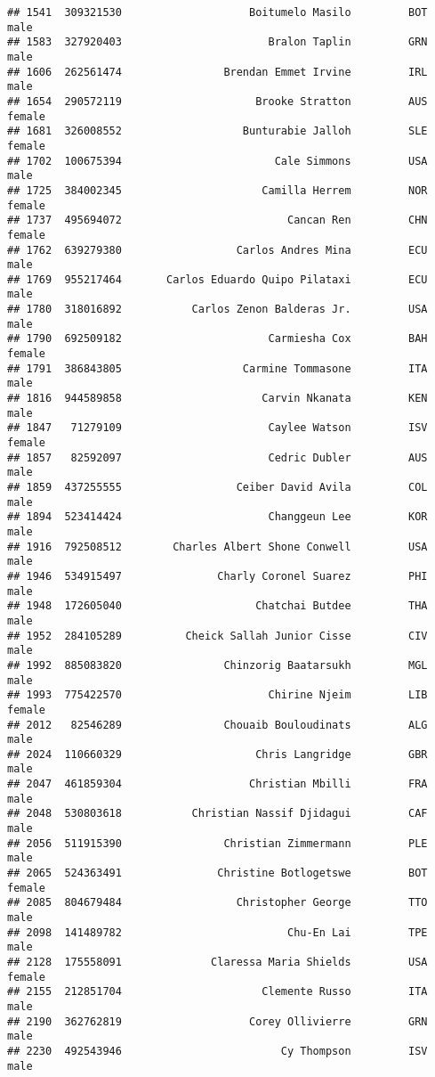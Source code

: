 \documentclass[]{article}
\begin{document}
\begin{verbatim}
## 1541  309321530                    Boitumelo Masilo         BOT   male
## 1583  327920403                       Bralon Taplin         GRN   male
## 1606  262561474                Brendan Emmet Irvine         IRL   male
## 1654  290572119                     Brooke Stratton         AUS female
## 1681  326008552                   Bunturabie Jalloh         SLE female
## 1702  100675394                        Cale Simmons         USA   male
## 1725  384002345                      Camilla Herrem         NOR female
## 1737  495694072                          Cancan Ren         CHN female
## 1762  639279380                  Carlos Andres Mina         ECU   male
## 1769  955217464       Carlos Eduardo Quipo Pilataxi         ECU   male
## 1780  318016892           Carlos Zenon Balderas Jr.         USA   male
## 1790  692509182                       Carmiesha Cox         BAH female
## 1791  386843805                   Carmine Tommasone         ITA   male
## 1816  944589858                      Carvin Nkanata         KEN   male
## 1847   71279109                       Caylee Watson         ISV female
## 1857   82592097                       Cedric Dubler         AUS   male
## 1859  437255555                  Ceiber David Avila         COL   male
## 1894  523414424                       Changgeun Lee         KOR   male
## 1916  792508512        Charles Albert Shone Conwell         USA   male
## 1946  534915497               Charly Coronel Suarez         PHI   male
## 1948  172605040                     Chatchai Butdee         THA   male
## 1952  284105289          Cheick Sallah Junior Cisse         CIV   male
## 1992  885083820                Chinzorig Baatarsukh         MGL   male
## 1993  775422570                       Chirine Njeim         LIB female
## 2012   82546289                Chouaib Bouloudinats         ALG   male
## 2024  110660329                     Chris Langridge         GBR   male
## 2047  461859304                    Christian Mbilli         FRA   male
## 2048  530803618           Christian Nassif Djidagui         CAF   male
## 2056  511915390                Christian Zimmermann         PLE   male
## 2065  524363491               Christine Botlogetswe         BOT female
## 2085  804679484                  Christopher George         TTO   male
## 2098  141489782                          Chu-En Lai         TPE   male
## 2128  175558091              Claressa Maria Shields         USA female
## 2155  212851704                      Clemente Russo         ITA   male
## 2190  362762819                    Corey Ollivierre         GRN   male
## 2230  492543946                         Cy Thompson         ISV   male

\end{verbatim}
\end{document}
